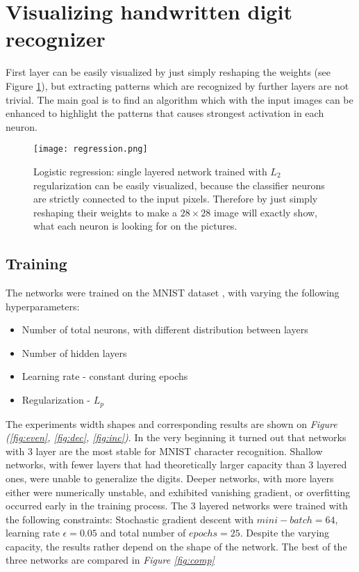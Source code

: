 \section{Visualizing handwritten digit recognizer}
First layer can be easily visualized by just simply reshaping the weights (see Figure \ref{fig:regression}), but extracting patterns which are recognized by further layers are not trivial. The main goal is to find an algorithm which with the input images can be enhanced to highlight the patterns that causes strongest activation in each neuron.


\begin{figure}
    \centering
    \texttt{[image: regression.png]}
    \caption{Logistic regression: single layered network trained with $L_2$ regularization can be easily visualized, because the classifier neurons are strictly connected to the input pixels. Therefore by just simply reshaping their weights to make a $28 \times 28$ image will exactly show, what each neuron is looking for on the pictures.}
    \label{fig:regression}
\end{figure}

\subsection{Training}
\label{train}
The networks were trained on the MNIST dataset \cite{mnist}, with varying the following hyperparameters:
\begin{itemize}
    \item Number of total neurons, with different distribution between layers
    \item Number of hidden layers
    \item Learning rate - constant during epochs
    \item Regularization - $L_p$
\end{itemize}

The experiments width shapes and corresponding results are shown on \emph{Figure (\ref{fig:even}, \ref{fig:dec}, \ref{fig:inc})}.
In the very beginning it turned out that networks with 3 layer are the most stable for MNIST character recognition. 
Shallow networks, with fewer layers that had theoretically larger capacity than 3 layered ones, were unable to generalize the digits.
Deeper networks, with more layers either were numerically unstable, and exhibited vanishing gradient, or overfitting occurred early in the training process.
The 3 layered networks were trained with the following constraints: Stochastic gradient descent with $mini-batch=64$, learning rate $\epsilon = 0.05$ and total number of $epochs=25$.
Despite the varying capacity, the results rather depend on the shape of the network. The best of the three networks are compared in \emph{Figure \ref{fig:comp}} 



